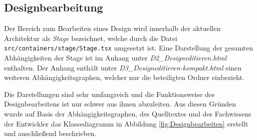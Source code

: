 \subsection{Designbearbeitung}
Der Bereich zum Bearbeiten eines Design wird innerhalb der aktuellen Architektur als \emph{Stage} bezeichnet, welche durch die Datei  
\lstinline|src/containers/stage/Stage.tsx| umgesetzt ist. 
Eine Darstellung der gesamten Abhängigkeiten der Stage ist im Anhang unter \emph{D2\_Designeditieren.html} enthalten. Der Anhang enthält unter \emph{D3\_Designeditieren-kompakt.html} einen weiteren Abhängigkeitsgraphen, welcher nur die beteiligten Ordner einbezieht. 

Die Darstellungen sind sehr umfangreich und die Funktionsweise des Designbearbeitens ist nur schwer aus ihnen abzuleiten. Aus diesen Gründen wurde auf Basis der Abhängigkeitsgraphen, des Quelltextes und des Fachwissens der Entwickler das Klassediagramm in Abbildung \ref{fig:Designbearbeiten} erstellt und anschließend beschrieben.

